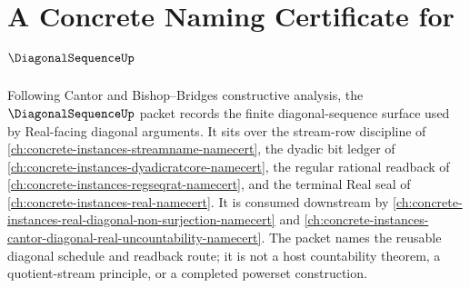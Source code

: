 \chapter{A Concrete Naming Certificate for $\DiagonalSequenceUp$}
\label{ch:concrete-instances-diagonal-sequence-namecert}

Following Cantor and Bishop--Bridges constructive analysis, the $\DiagonalSequenceUp$ packet records the finite diagonal-sequence surface used by Real-facing diagonal arguments. It sits over the stream-row discipline of \autoref{ch:concrete-instances-streamname-namecert}, the dyadic bit ledger of \autoref{ch:concrete-instances-dyadicratcore-namecert}, the regular rational readback of \autoref{ch:concrete-instances-regseqrat-namecert}, and the terminal Real seal of \autoref{ch:concrete-instances-real-namecert}. It is consumed downstream by \autoref{ch:concrete-instances-real-diagonal-non-surjection-namecert} and \autoref{ch:concrete-instances-cantor-diagonal-real-uncountability-namecert}. The packet names the reusable diagonal schedule and readback route; it is not a host countability theorem, a quotient-stream principle, or a completed powerset construction.

